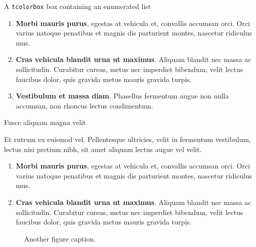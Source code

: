 \documentclass[final]{beamer}
\newlength{\colwidth}
\begin{document}
\begin{frame}[t]
\begin{columns}[t]
\begin{column}{\colwidth}
\begin{defbox}{A \texttt{tcolorbox} box containing an enumerated list}{}
				\begin{enumerate}
					\item \textbf{Morbi mauris purus}, egestas at vehicula et, convallis
					accumsan orci. Orci varius natoque penatibus et magnis dis parturient
					montes, nascetur ridiculus mus.
					\item \textbf{Cras vehicula blandit urna ut maximus}. Aliquam blandit nec
					massa ac sollicitudin. Curabitur cursus, metus nec imperdiet bibendum,
					velit lectus faucibus dolor, quis gravida metus mauris gravida turpis.
					\item \textbf{Vestibulum et massa diam}. Phasellus fermentum augue non
					nulla accumsan, non rhoncus lectus condimentum.
				\end{enumerate}
				
			\end{defbox}
			
			\begin{block}{Fusce aliquam magna velit}
				
				Et rutrum ex euismod vel. Pellentesque ultricies, velit in fermentum
				vestibulum, lectus nisi pretium nibh, sit amet aliquam lectus augue vel
				velit. 
				
				\begin{enumerate}
					\item \textbf{Morbi mauris purus}, egestas at vehicula et, convallis
					accumsan orci. Orci varius natoque penatibus et magnis dis parturient
					montes, nascetur ridiculus mus.
					\item \textbf{Cras vehicula blandit urna ut maximus}. Aliquam blandit nec
					massa ac sollicitudin. Curabitur cursus, metus nec imperdiet bibendum,
					velit lectus faucibus dolor, quis gravida metus mauris gravida turpis.
				\end{enumerate}
				
				\begin{figure}
					\centering
					\caption{Another figure caption.}
				\end{figure}
				

\end{block}
\end{column}
\end{columns}
\end{frame}
\end{document}
